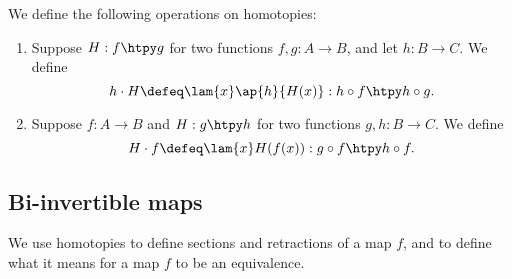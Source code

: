 \begin{defn}
We define the following  operations on homotopies:
\begin{enumerate}
\item Suppose $H:f\htpy g$ for two functions $f,g:A\to B$, and let $h:B\to C$. We define
\begin{equation*}
h\cdot H\defeq \lam{x}\ap{h}{H(x)}:h\circ f\htpy h\circ g.
\end{equation*}
\item Suppose $f:A\to B$ and $H:g\htpy h$ for two functions $g,h:B\to C$. We define
\begin{equation*}
H\cdot f\defeq\lam{x}H(f(x)):g\circ f\htpy h\circ f.
\end{equation*}
\end{enumerate}
\end{defn}

\subsection{Bi-invertible maps}

We use homotopies to define sections and retractions of a map $f$, and to define what it means for a map $f$ to be an equivalence.

